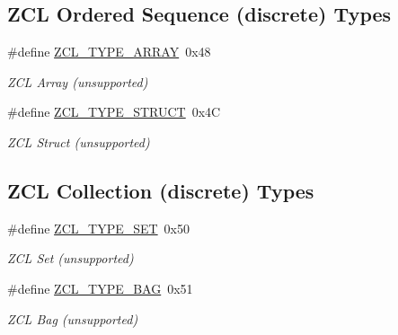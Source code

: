 \subsection*{Z\-C\-L Ordered Sequence (discrete) Types}
\begin{DoxyCompactItemize}
\item 
\hypertarget{group__zcl__types_ga5f609d45e4eb91ae4187bf912e4f870b}{\#define \hyperlink{group__zcl__types_ga5f609d45e4eb91ae4187bf912e4f870b}{Z\-C\-L\-\_\-\-T\-Y\-P\-E\-\_\-\-A\-R\-R\-A\-Y}~0x48}\label{group__zcl__types_ga5f609d45e4eb91ae4187bf912e4f870b}

\begin{DoxyCompactList}\small\item\em Z\-C\-L Array (unsupported) \end{DoxyCompactList}\item 
\hypertarget{group__zcl__types_ga2d94a79998fd3cdd13a2cd9ed25b88cb}{\#define \hyperlink{group__zcl__types_ga2d94a79998fd3cdd13a2cd9ed25b88cb}{Z\-C\-L\-\_\-\-T\-Y\-P\-E\-\_\-\-S\-T\-R\-U\-C\-T}~0x4\-C}\label{group__zcl__types_ga2d94a79998fd3cdd13a2cd9ed25b88cb}

\begin{DoxyCompactList}\small\item\em Z\-C\-L Struct (unsupported) \end{DoxyCompactList}\end{DoxyCompactItemize}
\subsection*{Z\-C\-L Collection (discrete) Types}
\begin{DoxyCompactItemize}
\item 
\hypertarget{group__zcl__types_ga21ab004d25434d25e1e17865e895f1a7}{\#define \hyperlink{group__zcl__types_ga21ab004d25434d25e1e17865e895f1a7}{Z\-C\-L\-\_\-\-T\-Y\-P\-E\-\_\-\-S\-E\-T}~0x50}\label{group__zcl__types_ga21ab004d25434d25e1e17865e895f1a7}

\begin{DoxyCompactList}\small\item\em Z\-C\-L Set (unsupported) \end{DoxyCompactList}\item 
\hypertarget{group__zcl__types_gacd6bd1e469abc59bab04e247bc85997b}{\#define \hyperlink{group__zcl__types_gacd6bd1e469abc59bab04e247bc85997b}{Z\-C\-L\-\_\-\-T\-Y\-P\-E\-\_\-\-B\-A\-G}~0x51}\label{group__zcl__types_gacd6bd1e469abc59bab04e247bc85997b}

\begin{DoxyCompactList}\small\item\em Z\-C\-L Bag (unsupported) \end{DoxyCompactList}\end{DoxyCompactItemize}
